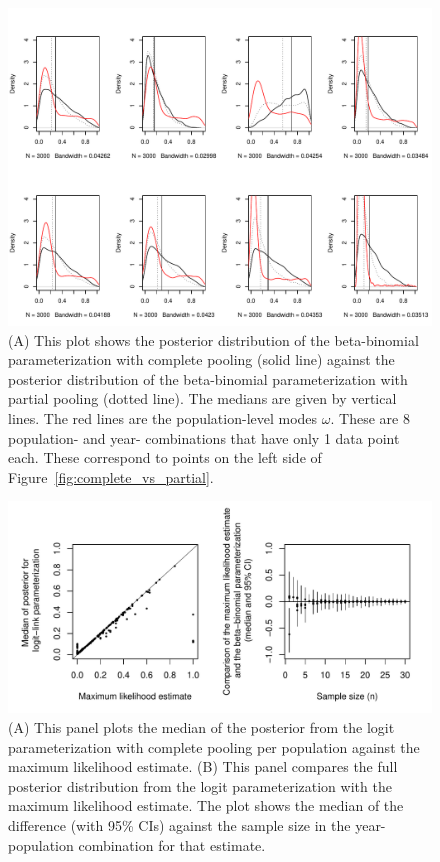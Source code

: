 \documentclass[12pt, oneside, titlepage]{article}   	%
\begin{document}
 \begin{figure}[h]
   \centering
       \includegraphics[page=1,width=.9\textwidth]{../figures/appendix-x-mismatch}  
    \caption{ (A) This plot shows the posterior distribution of the beta-binomial parameterization with complete pooling (solid line) against the posterior distribution of the beta-binomial parameterization with partial pooling (dotted line). The medians are given by vertical lines. The red lines are the population-level modes $\omega$. These are 8 population- and year- combinations that have only 1 data point each. These correspond to points on the left side of Figure~\ref{fig:complete_vs_partial}. }
 \label{fig:mismatch}
\end{figure}

 \begin{figure}[h]
   \centering
       \includegraphics[page=1,width=.9\textwidth]{../figures/appendix-x-mle_bayeslogit}  
    \caption{ (A) This panel plots the median of the posterior from the logit parameterization with complete pooling per population against the maximum likelihood estimate. (B) This panel compares the full posterior distribution from the logit parameterization with the maximum likelihood estimate. The plot shows the median of the difference (with 95\% CIs) against the sample size in the year-population combination for that estimate. }
 \label{fig:logit}
\end{figure}
\end{document}
